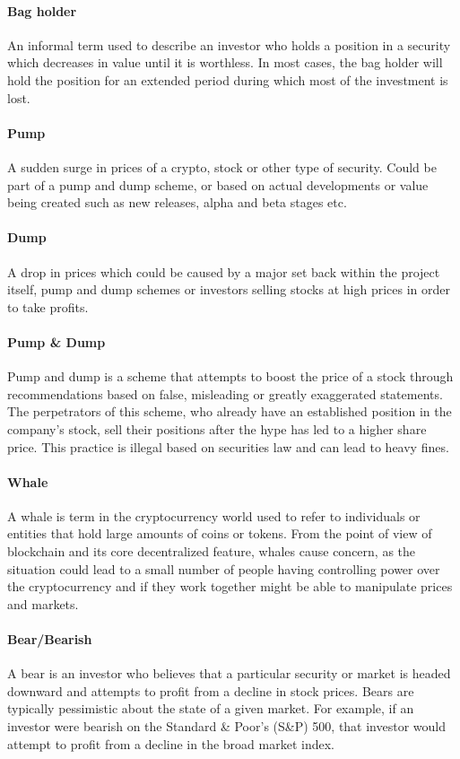 \paragraph{Bag holder}
An informal term used to describe an investor who holds a position in a security which decreases in value until it is worthless. In most cases, the bag holder will hold the position for an extended period during which most of the investment is lost.  

\paragraph{Pump}
A sudden surge in prices of a crypto, stock or other type of security. Could be part of a pump and dump scheme, or based on actual developments or value being created such as new releases, alpha and beta stages etc.

\paragraph{Dump}
A drop in prices which could be caused by a major set back within the project itself, pump and dump schemes or investors selling stocks at high prices in order to take profits.

\paragraph{Pump & Dump}
Pump and dump is a scheme that attempts to boost the price of a stock through recommendations based on false, misleading or greatly exaggerated statements. The perpetrators of this scheme, who already have an established position in the company's stock, sell their positions after the hype has led to a higher share price. This practice is illegal based on securities law and can lead to heavy fines.  

\paragraph{Whale}
A whale is term in the cryptocurrency world used to refer to individuals or entities that hold large amounts of coins or tokens. From the point of view of blockchain and its core decentralized feature, whales cause concern, as the situation could lead to a small number of people having controlling power over the cryptocurrency and if they work together might be able to manipulate prices and markets.  

\paragraph{Bear/Bearish}
A bear is an investor who believes that a particular security or market is headed downward and attempts to profit from a decline in stock prices. Bears are typically pessimistic about the state of a given market. For example, if an investor were bearish on the Standard & Poor's (S&P) 500, that investor would attempt to profit from a decline in the broad market index.  


